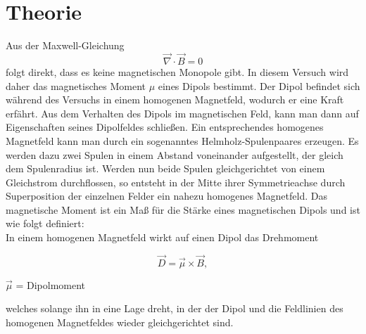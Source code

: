 \newpage					%




\section{Theorie}
Aus der Maxwell-Gleichung
\begin{equation}
\vec{\nabla} \cdot \vec{B} = 0
\end{equation}
folgt direkt, dass es keine magnetischen Monopole gibt. In diesem Versuch wird daher das magnetisches Moment $\mu$ eines Dipols bestimmt. Der Dipol befindet sich während des Versuchs in einem homogenen Magnetfeld, wodurch er eine Kraft erfährt. Aus dem Verhalten des Dipols im magnetischen Feld, kann man dann auf Eigenschaften seines Dipolfeldes schließen. Ein entsprechendes homogenes Magnetfeld kann man durch ein sogenanntes Helmholz-Spulenpaares erzeugen. Es werden dazu zwei Spulen in einem Abstand voneinander aufgestellt, der gleich dem Spulenradius ist. Werden nun beide Spulen gleichgerichtet von einem Gleichstrom durchflossen, so entsteht in der Mitte ihrer Symmetrieachse durch Superposition der einzelnen Felder ein nahezu homogenes Magnetfeld.
Das magnetische Moment ist ein Maß für die Stärke eines magnetischen Dipols und ist wie folgt definiert:\\
In einem homogenen Magnetfeld wirkt auf einen Dipol das Drehmoment
\begin{formel}[H]
\begin{equation}
\vec D = \vec{\mu} \times \vec{B},
\end{equation}
\caption*{\small{$\vec{\mu}$ = Dipolmoment}}
\end{formel}
welches solange ihn in eine Lage dreht, in der der Dipol und die Feldlinien des homogenen Magnetfeldes wieder gleichgerichtet sind.
 
 
